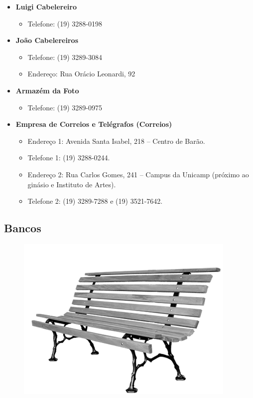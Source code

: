 \begin{itemize}
\item  \textbf{Luigi Cabelereiro}
\begin{itemize}
\item  Telefone: (19) 3288-0198
\end{itemize}
\end{itemize}

\begin{itemize}
\item  \textbf{João Cabelereiros}
\begin{itemize}
\item  Telefone: (19) 3289-3084
\item  Endereço: Rua Orácio Leonardi, 92
\end{itemize}
\end{itemize}

\begin{itemize}
\item  \textbf{Armazém da Foto}
\begin{itemize}
\item  Telefone: (19) 3289-0975
\end{itemize}
\end{itemize}

\begin{itemize}
\item  \textbf{Empresa de Correios e Telégrafos (Correios)}
\begin{itemize}
\item  Endereço 1: Avenida Santa Isabel, 218 -- Centro de Barão.
\item  Telefone 1: (19) 3288-0244.
\item  Endereço 2: Rua Carlos Gomes, 241 -- Campus da Unicamp (próximo ao ginásio e Instituto de Artes).
\item  Telefone 2: (19) 3289-7288 e (19) 3521-7642.
\end{itemize}
\end{itemize}

\subsection{Bancos}
\begin{figure}[h!]
    \centering
    \includegraphics[scale=2.28,keepaspectratio=true]{img/imgs/9-outras_necessidades/raizmadeira.png}
\end{figure}


